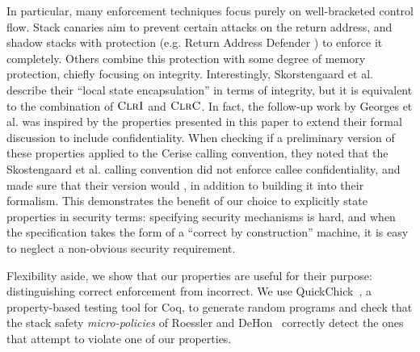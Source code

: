 \documentclass[10pt,conference]{ieeetran}%
\theoremstyle{definition}
\begin{document}
In particular, many enforcement techniques focus purely on
well-bracketed control flow. Stack canaries aim to prevent certain attacks on the return
address, and shadow stacks with protection (e.g. Return Address Defender \cite{Chiueh2001RAD})
to enforce it completely. Others combine this protection with some degree of memory protection,
chiefly focusing on integrity. Interestingly, Skorstengaard et al. \cite{SkorstengaardSTKJFP}
describe their ``local state encapsulation'' in terms of integrity, but it is equivalent
to the combination of \(\textnormal{\sc ClrI}\) and \(\textnormal{\sc ClrC}\). In fact, the follow-up work by 
Georges et al. \cite{Georges22:TempsDesCerises} was inspired by the properties presented in this paper to extend their formal discussion to include confidentiality.
When checking if a preliminary version of these properties applied to
the Cerise calling convention, they noted that the Skostengaard et al. calling convention
did not enforce callee confidentiality, and made sure that their version would
\cite{Georges22:personalcommunication}, in addition to building it into their formalism.
This demonstrates the benefit of our choice to explicitly state properties in security
terms: specifying security mechanisms is hard, and when the specification takes the
form of a ``correct by construction'' machine, it is easy to neglect a non-obvious
security requirement.


Flexibility aside, we show that our properties are useful for their purpose:
distinguishing correct enforcement from incorrect. We use
QuickChick~\cite{Denes:VSL2014,Pierce:SF4}, a property-based testing
tool for Coq, to generate random programs and check that the
stack safety {\em micro-policies} of Roessler and DeHon~\cite{DBLP:conf/sp/RoesslerD18}
correctly detect the ones that attempt to violate one of our properties.

\end{document}
